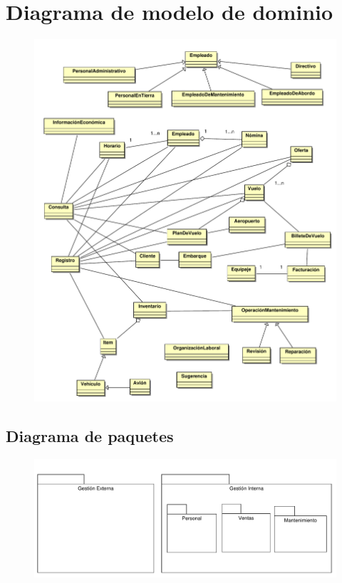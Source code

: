 \documentclass[11pt, a4paper, twoside, titlepage]{article}
\begin{document}
	\section{Diagrama de modelo de dominio}
		\begin{figure}[H]\centering
			\hspace*{-.5cm}
			\includegraphics[scale=.722]{diagramas/modelodominio.pdf}
		\end{figure}	
	\newpage

\begin{landscape}
	\section{Diagrama de paquetes}
		\vfill
		\begin{figure}[H]\centering
			\hspace*{-.5cm}
			\includegraphics[scale=1]{diagramas/paquetes.pdf}
		\end{figure}
		\vfill
\end{landscape}
	\newpage
\end{document}
